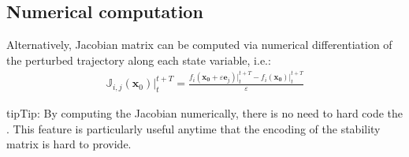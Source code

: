 \documentclass[letterpaper,10pt,english,openany,oneside]{sphinxmanual}
\begin{document}
\begin{quote}
\begin{sphinxVerbatim}[commandchars=\\\{\}]
          
          \PYG{p}{[} \PYG{p}{]}
     
            
          \PYG{p}{[} \PYG{p}{]}
     
\end{sphinxVerbatim}
\end{quote}


\subsection{Numerical computation}
\label{\detokenize{multiple_shooting/jacobian_computation:numerical-computation}}
Alternatively, Jacobian matrix can be computed via numerical differentiation of the perturbed
trajectory along each state variable, i.e.:
\begin{equation}\label{equation:multiple_shooting/jacobian_computation:jac_numerical}
\begin{split}\mathbb{J}_{i,j} (\mathbf{x}_0) \Big \rvert_{t}^{t+T} = \frac{f_{i}(\mathbf{x_0} + \varepsilon\mathbf{\hat{e}}_{j}) \Big \rvert_{t}^{t+T} -f_{i}(\mathbf{x_0}) \Big \rvert_{t}^{t+T} }{\varepsilon}\end{split}
\end{equation}
\begin{sphinxadmonition}{tip}{Tip:}
By computing the Jacobian numerically, there is no need to hard code the .
This feature is particularly useful anytime that the encoding of the stability matrix is hard to provide.
\end{sphinxadmonition}
\end{document}
